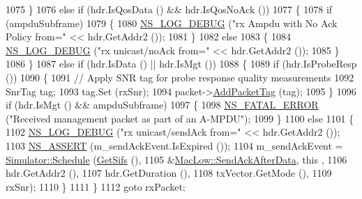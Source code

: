 \begin{DoxyCode}
1075         \}
1076       \textcolor{keywordflow}{else} \textcolor{keywordflow}{if} (hdr.IsQosData () && hdr.IsQosNoAck ())
1077         \{
1078           \textcolor{keywordflow}{if} (ampduSubframe)
1079             \{
1080               \hyperlink{group__logging_ga413f1886406d49f59a6a0a89b77b4d0a}{NS\_LOG\_DEBUG} (\textcolor{stringliteral}{"rx Ampdu with No Ack Policy from="} << hdr.GetAddr2 ());
1081             \}
1082           \textcolor{keywordflow}{else}
1083             \{
1084               \hyperlink{group__logging_ga413f1886406d49f59a6a0a89b77b4d0a}{NS\_LOG\_DEBUG} (\textcolor{stringliteral}{"rx unicast/noAck from="} << hdr.GetAddr2 ());
1085             \}
1086         \}
1087       \textcolor{keywordflow}{else} \textcolor{keywordflow}{if} (hdr.IsData () || hdr.IsMgt ())
1088         \{
1089           \textcolor{keywordflow}{if} (hdr.IsProbeResp ())
1090             \{
1091               \textcolor{comment}{// Apply SNR tag for probe response quality measurements}
1092               SnrTag tag;
1093               tag.Set (rxSnr);
1094               packet->\hyperlink{classns3_1_1Packet_a7400b8655852f5271c5957250d0141af}{AddPacketTag} (tag);
1095             \}
1096           \textcolor{keywordflow}{if} (hdr.IsMgt () && ampduSubframe)
1097             \{
1098               \hyperlink{group__fatal_ga5131d5e3f75d7d4cbfd706ac456fdc85}{NS\_FATAL\_ERROR} (\textcolor{stringliteral}{"Received management packet as part of an A-MPDU"});
1099             \}
1100           \textcolor{keywordflow}{else}
1101             \{
1102               \hyperlink{group__logging_ga413f1886406d49f59a6a0a89b77b4d0a}{NS\_LOG\_DEBUG} (\textcolor{stringliteral}{"rx unicast/sendAck from="} << hdr.GetAddr2 ());
1103               \hyperlink{assert_8h_a6dccdb0de9b252f60088ce281c49d052}{NS\_ASSERT} (m\_sendAckEvent.IsExpired ());
1104               m\_sendAckEvent = \hyperlink{classns3_1_1Simulator_a671882c894a08af4a5e91181bf1eec13}{Simulator::Schedule} (\hyperlink{classns3_1_1MacLow_a9107421b7ed9f291d60b8344b4918e56}{GetSifs} (),
1105                                                     &\hyperlink{classns3_1_1MacLow_a8db1635644b89072dfcb5fbc2330031b}{MacLow::SendAckAfterData}, \textcolor{keyword}{this}
      ,
1106                                                     hdr.GetAddr2 (),
1107                                                     hdr.GetDuration (),
1108                                                     txVector.GetMode (),
1109                                                     rxSnr);
1110             \}
1111         \}
1112       \textcolor{keywordflow}{goto} rxPacket;

\end{DoxyCode}
